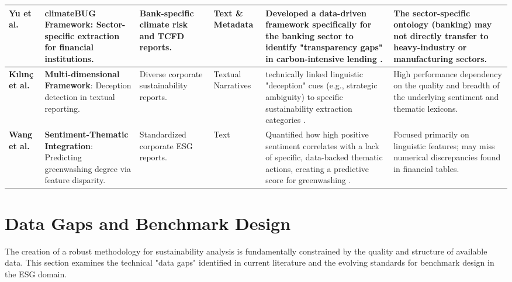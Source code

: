 \begin{landscape}
\begin{table}[p]
\begin{tabularx}{\linewidth}{|p{1.8cm}|p{3.5cm}|p{2.5cm}|p{1.8cm}|X|X|}
\textbf{Yu et al.}  \parencite{yinan_yu_e282fd98} & \textbf{climateBUG Framework}: Sector-specific extraction for financial institutions. & Bank-specific climate risk and TCFD reports. & Text \& Metadata & Developed a data-driven framework specifically for the banking sector to identify "transparency gaps" in carbon-intensive lending  \parencite{yinan_yu_e282fd98}. & The sector-specific ontology (banking) may not directly transfer to heavy-industry or manufacturing sectors. \\ \hline
\textbf{Kılınç et al.}  \parencite{yavuz_k_l_n__64e32f80} & \textbf{Multi-dimensional Framework}: Deception detection in textual reporting. & Diverse corporate sustainability reports. & Textual Narratives & technically linked linguistic "deception" cues (e.g., strategic ambiguity) to specific sustainability extraction categories  \parencite{yavuz_k_l_n__64e32f80}. & High performance dependency on the quality and breadth of the underlying sentiment and thematic lexicons. \\ \hline
\textbf{Wang et al.}  \parencite{xiaojia_wang_02351a60} & \textbf{Sentiment-Thematic Integration}: Predicting greenwashing degree via feature disparity. & Standardized corporate ESG reports. & Text & Quantified how high positive sentiment correlates with a lack of specific, data-backed thematic actions, creating a predictive score for greenwashing  \parencite{xiaojia_wang_02351a60}. & Focused primarily on linguistic features; may miss numerical discrepancies found in financial tables. \\ \hline
\end{tabularx}
\end{table}
\end{landscape}

\section{ Data Gaps and Benchmark Design}

The creation of a robust methodology for sustainability analysis is fundamentally constrained by the quality and structure of available data. This section examines the technical "data gaps" identified in current literature and the evolving standards for benchmark design in the ESG domain.
